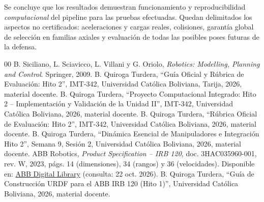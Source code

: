 \documentclass[conference,letterpaper]{IEEEtran}
\begin{document}
	Se concluye que los resultados demuestran funcionamiento y reproducibilidad \emph{computacional} del pipeline para las pruebas efectuadas. Quedan delimitados los aspectos no certificados: aceleraciones y cargas reales, colisiones, garantía global de selección en familias axiales y evaluación de todas las posibles poses futuras de la defensa.
	
	\balance
	\begin{thebibliography}{00}
		 B. Siciliano, L. Sciavicco, L. Villani y G. Oriolo, \emph{Robotics: Modelling, Planning and Control}. Springer, 2009.
		 B. Quiroga Turdera, ``Guía Oficial y Rúbrica de Evaluación: Hito 2'', IMT-342, Universidad Católica Boliviana, Tarija, 2026, material docente.
		 B. Quiroga Turdera, ``Proyecto Computacional Integrado: Hito 2 -- Implementación y Validación de la Unidad II'', IMT-342, Universidad Católica Boliviana, 2026, material docente.
		 B. Quiroga Turdera, ``Rúbrica Oficial de Evaluación: Hito 2'', IMT-342, Universidad Católica Boliviana, 2026, material docente.
		 B. Quiroga Turdera, ``Dinámica Esencial de Manipuladores e Integración Hito 2'', Semana 9, Sesión 2, Universidad Católica Boliviana, 2026, material docente.
		 ABB Robotics, \emph{Product Specification -- IRB 120}, doc. 3HAC035960-001, rev. W, 2023, págs. 14 (dimensiones), 34 (rangos) y 36 (velocidades). Disponible en: \href{https://library.e.abb.com/public/429d251dbce44b049ba7d6107a422de0/3HAC035960\%20PS\%20IRB\%20120-en.pdf}{ABB Digital Library} (consulta: 22 oct. 2026).
		 B. Quiroga Turdera, ``Guía de Construcción URDF para el ABB IRB 120 (Hito 1)'', Universidad Católica Boliviana, 2026, material docente.
	\end{thebibliography}
\end{document}
